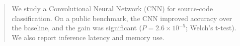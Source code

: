 \begin{abstract}
We study a Convolutional Neural Network (CNN) for source-code classification. On
a public benchmark, the CNN improved accuracy over the baseline, and the gain was
significant ($P = 2.6 \times 10^{-5}$; Welch's t-test). We also report inference
latency and memory use.
\end{abstract}

